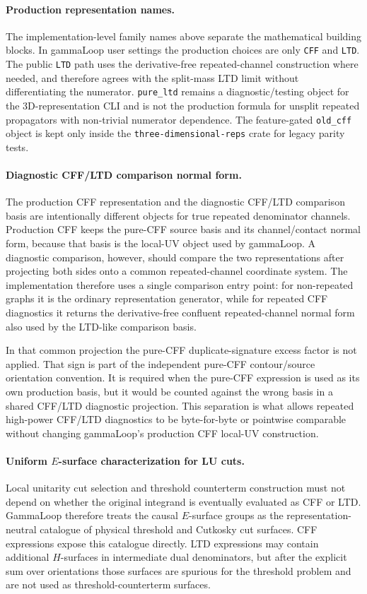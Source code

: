 \documentclass[11pt,a4paper]{report}
\begin{document}
\paragraph{Production representation names.}
The implementation-level family names above separate the mathematical building
blocks.  In gammaLoop user settings the production choices are only
\texttt{CFF} and \texttt{LTD}.  The public \texttt{LTD} path uses the
derivative-free repeated-channel construction where needed, and therefore
agrees with the split-mass LTD limit without differentiating the numerator.
\texttt{pure\_ltd} remains a diagnostic/testing object for the 3D-representation
CLI and is not the production formula for unsplit repeated propagators with
non-trivial numerator dependence.  The feature-gated \texttt{old\_cff} object is
kept only inside the \texttt{three-dimensional-reps} crate for legacy parity
tests.

\paragraph{Diagnostic CFF/LTD comparison normal form.}
The production CFF representation and the diagnostic CFF/LTD comparison basis
are intentionally different objects for true repeated denominator channels.
Production CFF keeps the pure-CFF source basis and its channel/contact normal
form, because that basis is the local-UV object used by gammaLoop.  A diagnostic
comparison, however, should compare the two representations after projecting
both sides onto a common repeated-channel coordinate system.  The implementation
therefore uses a single comparison entry point: for non-repeated graphs it is
the ordinary representation generator, while for repeated CFF diagnostics it
returns the derivative-free confluent repeated-channel normal form also used by
the LTD-like comparison basis.

In that common projection the pure-CFF duplicate-signature excess factor is not
applied.  That sign is part of the independent pure-CFF contour/source
orientation convention.  It is required when the pure-CFF expression is used as
its own production basis, but it would be counted against the wrong basis in a
shared CFF/LTD diagnostic projection.  This separation is what allows repeated
high-power CFF/LTD diagnostics to be byte-for-byte or pointwise comparable
without changing gammaLoop's production CFF local-UV construction.

\paragraph{Uniform \(E\)-surface characterization for LU cuts.}
Local unitarity cut selection and threshold counterterm construction must not
depend on whether the original integrand is eventually evaluated as CFF or LTD.
GammaLoop therefore treats the causal \(E\)-surface groups as the
representation-neutral catalogue of physical threshold and Cutkosky cut
surfaces.  CFF expressions expose this catalogue directly.  LTD expressions may
contain additional \(H\)-surfaces in intermediate dual denominators, but after
the explicit sum over orientations those surfaces are spurious for the
threshold problem and are not used as threshold-counterterm surfaces.
\end{document}

